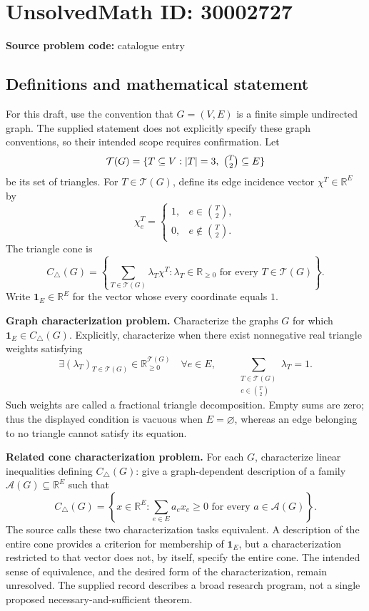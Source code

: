 \documentclass[11pt]{article}
\newcommand{\R}{\mathbb{R}}
\begin{document}
\section*{UnsolvedMath ID: 30002727}
\textbf{Source problem code:} catalogue entry
\subsection{Definitions and mathematical statement}
For this draft, use the convention that \(G=(V,E)\) is a finite simple undirected graph. The supplied statement does not explicitly specify these graph conventions, so their intended scope requires confirmation. Let
\[
\mathcal T(G)=\{T\subseteq V: |T|=3,\ \tbinom{T}{2}\subseteq E\}
\]
be its set of triangles. For \(T\in\mathcal T(G)\), define its edge incidence vector \(\chi^T\in\R^E\) by
\[
\chi^T_e=\begin{cases}1,&e\in\binom{T}{2},\\0,&e\notin\binom{T}{2}.\end{cases}
\]
The triangle cone is
\[
C_\triangle(G)=\left\{\sum_{T\in\mathcal T(G)}\lambda_T\chi^T:\lambda_T\in\R_{\geq0}\text{ for every }T\in\mathcal T(G)\right\}.
\]
Write \(\mathbf1_E\in\R^E\) for the vector whose every coordinate equals \(1\).

\textbf{Graph characterization problem.} Characterize the graphs \(G\) for which \(\mathbf1_E\in C_\triangle(G)\). Explicitly, characterize when there exist nonnegative real triangle weights satisfying
\[
\exists (\lambda_T)_{T\in\mathcal T(G)}\in\R_{\geq0}^{\mathcal T(G)}\quad\forall e\in E,\qquad
\sum_{\substack{T\in\mathcal T(G)\\e\in\binom{T}{2}}}\lambda_T=1.
\]
Such weights are called a fractional triangle decomposition. Empty sums are zero; thus the displayed condition is vacuous when \(E=\varnothing\), whereas an edge belonging to no triangle cannot satisfy its equation.

\textbf{Related cone characterization problem.} For each \(G\), characterize linear inequalities defining \(C_\triangle(G)\): give a graph-dependent description of a family \(\mathcal A(G)\subseteq\R^E\) such that
\[
C_\triangle(G)=\left\{x\in\R^E:\sum_{e\in E}a_ex_e\geq0\text{ for every }a\in\mathcal A(G)\right\}.
\]
The source calls these two characterization tasks equivalent. A description of the entire cone provides a criterion for membership of \(\mathbf1_E\), but a characterization restricted to that vector does not, by itself, specify the entire cone. The intended sense of equivalence, and the desired form of the characterization, remain unresolved. The supplied record describes a broad research program, not a single proposed necessary-and-sufficient theorem.
\end{document}
